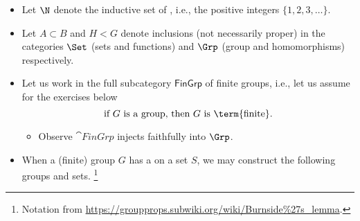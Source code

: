 \documentclass[onesided]{ccg-pset}
\author{Colton Grainger}
\date{\today}
\begin{document}
\maketitle

\begin{note}
    \label{conventions}
    \hfill
    \begin{itemize}

        \item Let $\N$ denote the inductive set of , i.e., the positive integers $\{1,2,3, \ldots\}$.
        \item Let $A\subset B$ and $H<G$ denote inclusions (not necessarily proper) in the categories $\Set$ (sets and functions) and $\Grp$ (group and homomorphisms) respectively.
        \item Let us work in the full subcategory $\mathsf{FinGrp}$ of finite groups, i.e., let us assume for the exercises below
            \begin{equation*}
                \text{if $G$ is a group, then $G$ is \term{finite}.}
            \end{equation*}
            \begin{itemize}
                \item Observe $\cat{FinGrp}$ injects faithfully into $\Grp$.
            \end{itemize}
        \item When a (finite) group $G$ has a  on a set $S$, we may construct the following groups and sets.%
            \footnote{%
                Notation from \url{https://groupprops.subwiki.org/wiki/Burnside\%27s_lemma}.
            }
        

\end{itemize}
\end{note}
\end{document}
